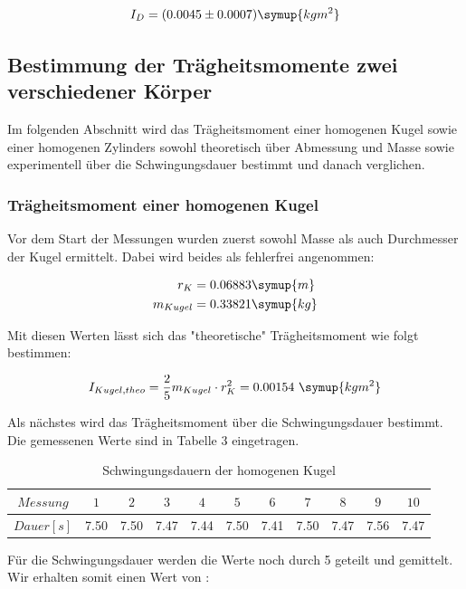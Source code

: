\begin{equation}
  I_D = (0.0045 \pm 0.0007) \symup{kg m^2}
\end{equation}

\subsection{Bestimmung der Trägheitsmomente zwei verschiedener Körper}
Im folgenden Abschnitt wird das Trägheitsmoment einer homogenen Kugel sowie einer
homogenen Zylinders sowohl theoretisch über Abmessung und Masse sowie experimentell über
die Schwingungsdauer bestimmt und danach verglichen.

\subsubsection{Trägheitsmoment einer homogenen Kugel}
Vor dem Start der Messungen wurden zuerst sowohl Masse als auch Durchmesser der Kugel ermittelt.
Dabei wird beides als fehlerfrei angenommen:

\begin{align}
  r_K &= 0.06883 \symup{m} \\
  m_{Kugel} &= 0.33821 \symup{kg}
\end{align}

Mit diesen Werten lässt sich das "theoretische" Trägheitsmoment wie folgt bestimmen:

\begin{equation}
  I_{Kugel,theo} = \frac{2}{5} m_{Kugel} \cdot r_K^2 = 0.00154 \,\, \symup{kg m^2}
\end{equation}

Als nächstes wird das Trägheitsmoment über die Schwingungsdauer bestimmt. Die gemessenen Werte
sind in Tabelle 3 eingetragen.

\begin{table}
  \centering
  \caption{Schwingungsdauern der homogenen Kugel}
  \begin{tabular}{c c c c c c c c c c c}
    \toprule $Messung$ & $1$ & $2$ & $3$ & $4$ & $5$ & $6$ & $7$ & $8$ & $9$ & $10$ \\
    \midrule $Dauer [s]$ & 7.50 & 7.50 & 7.47 & 7.44 & 7.50 & 7.41 & 7.50 & 7.47 & 7.56 & 7.47\\
    \bottomrule
  \end{tabular}
\end{table}

Für die Schwingungsdauer werden die Werte noch durch 5 geteilt und gemittelt. Wir erhalten somit einen Wert von :

